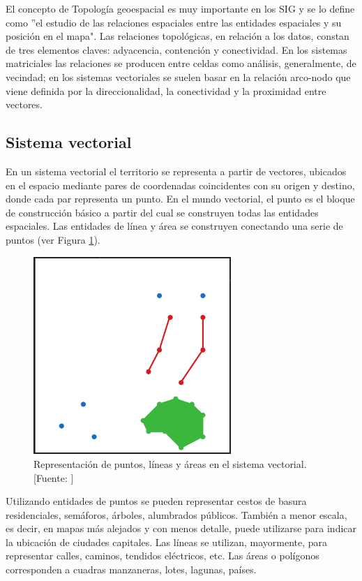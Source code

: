 El concepto de Topología geoespacial es muy importante en los SIG y se lo define como ''el estudio de las relaciones espaciales entre las entidades espaciales y su posición en el mapa". Las relaciones topológicas, en relación a los datos, constan de tres elementos claves: adyacencia, contención y conectividad. En los sistemas matriciales las relaciones se producen entre celdas como análisis, generalmente, de vecindad; en los sistemas vectoriales se suelen basar en la relación arco-nodo que viene definida por la direccionalidad, la conectividad y la proximidad entre vectores.

\subsection{Sistema vectorial}

En un sistema vectorial el territorio se representa a partir de vectores, ubicados en el espacio mediante pares de coordenadas coincidentes con su origen y destino, donde cada par representa un punto. En el mundo vectorial, el punto es el bloque de construcción básico a partir del cual se construyen todas las entidades espaciales. Las entidades de línea y área se construyen conectando una serie de puntos (ver Figura \ref{fig:modeloVectorial}).

\begin{figure}[H]
    \centering
    \includegraphics[width=7.5cm]{modeloVectorial.png}
    \caption{Representación de puntos, líneas y áreas en el sistema vectorial. [Fuente: ]}
    \label{fig:modeloVectorial}
\end{figure}

Utilizando entidades de puntos se pueden representar cestos de basura residenciales, semáforos, árboles, alumbrados públicos. También a menor escala, es decir, en mapas más alejados y con menos detalle, puede utilizarse para indicar la ubicación de ciudades capitales. Las líneas se utilizan, mayormente, para representar calles, caminos, tendidos eléctricos, etc. Las áreas o polígonos corresponden a cuadras manzaneras, lotes, lagunas, países.

